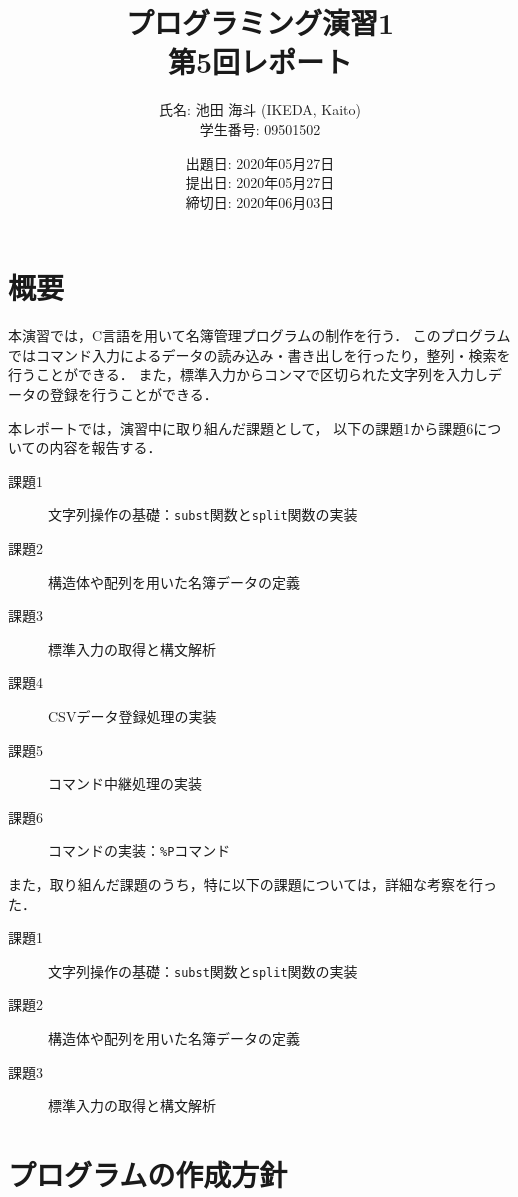 \documentclass[autodetect-engine,dvi=dvipdfmx,ja=standard,
               a4j,11pt]{bxjsarticle}
\title{プログラミング演習1 \\
       第5回レポート}
\author{氏名: 池田 海斗 (IKEDA, Kaito) \\
        学生番号: 09501502}
\date{出題日: 2020年05月27日 \\
      提出日: 2020年05月27日 \\
      締切日: 2020年06月03日 \\}
\begin{document}
\maketitle

\section{概要} \label{sec:1}

本演習では，C言語を用いて名簿管理プログラムの制作を行う．
このプログラムではコマンド入力によるデータの読み込み・書き出しを行ったり，整列・検索を行うことができる．
また，標準入力からコンマで区切られた文字列を入力しデータの登録を行うことができる．

本レポートでは，演習中に取り組んだ課題として，
以下の課題1から課題6についての内容を報告する．

\begin{description}
  \item[課題1] 文字列操作の基礎：\verb|subst|関数と\verb|split|関数の実装
  \item[課題2] 構造体や配列を用いた名簿データの定義
  \item[課題3] 標準入力の取得と構文解析
  \item[課題4] CSVデータ登録処理の実装
  \item[課題5] コマンド中継処理の実装
  \item[課題6] コマンドの実装：\verb|%P|コマンド
\end{description}

また，取り組んだ課題のうち，特に以下の課題については，詳細な考察を行った．

\begin{description}
  \item[課題1] 文字列操作の基礎：\verb|subst|関数と\verb|split|関数の実装
  \item[課題2] 構造体や配列を用いた名簿データの定義
  \item[課題3] 標準入力の取得と構文解析
\end{description}


\section{プログラムの作成方針} \label{sec:2}
\end{document}
